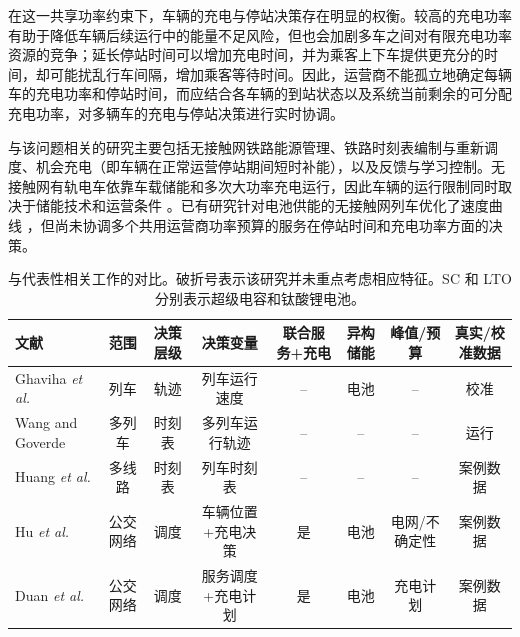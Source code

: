 \documentclass[conference]{IEEEtran}
\begin{document}
\begin{CJK*}{UTF8}{gbsn}
在这一共享功率约束下，车辆的充电与停站决策存在明显的权衡。较高的充电功率有助于降低车辆后续运行中的能量不足风险，但也会加剧多车之间对有限充电功率资源的竞争；延长停站时间可以增加充电时间，并为乘客上下车提供更充分的时间，却可能扰乱行车间隔，增加乘客等待时间。因此，运营商不能孤立地确定每辆车的充电功率和停站时间，而应结合各车辆的到站状态以及系统当前剩余的可分配充电功率，对多辆车的充电与停站决策进行实时协调。



与该问题相关的研究主要包括无接触网铁路能源管理、铁路时刻表编制与重新调度、机会充电（即车辆在正常运营停站期间短时补能），以及反馈与学习控制。无接触网有轨电车依靠车载储能和多次大功率充电运行，因此车辆的运行限制同时取决于储能技术和运营条件 \cite{guerrieri2019catenary}。已有研究针对电池供能的无接触网列车优化了速度曲线 \cite{ghaviha2019speed}，但尚未协调多个共用运营商功率预算的服务在停站时间和充电功率方面的决策。

\nocite{wang2019multitrain,liu2020robust,yang2020biobjective,huang2021integrated,huang2023twostage,liao2020realtime,he2020charging,hu2022joint,li2023cooperative,duan2023integrated,bi2024realtime,wu2022multidepot,li2023trajectory,schulman2017ppo,holland1975adaptation,kennedy1995pso,storn1997de}

\begin{table}[t]
\centering
\caption{与代表性相关工作的对比。破折号表示该研究并未重点考虑相应特征。SC 和 LTO 分别表示超级电容和钛酸锂电池。}
\label{tab:positioning}
\scriptsize
\setlength{\tabcolsep}{2.5pt}
\begin{tabular}{p{2.5cm}ccccccc}
\toprule
文献 & 范围 & 决策层级 & 决策变量 & 联合服务+充电 & 异构储能 & 峰值/预算 & 真实/校准数据 \\
\midrule
Ghaviha \textit{et al.} \cite{ghaviha2019speed}
& 列车
& 轨迹
& 列车运行速度
& --
& 电池
& --
& 校准 \\

Wang and Goverde \cite{wang2019multitrain}
& 多列车
& 时刻表
& 多列车运行轨迹
& --
& --
& --
& 运行 \\

Huang \textit{et al.} \cite{huang2021integrated}
& 多线路
& 时刻表
& 列车时刻表
& --
& --
& --
& 案例数据 \\

Hu \textit{et al.} \cite{hu2022joint}
& 公交网络
& 调度
& 车辆位置+充电决策
& 是
& 电池
& 电网/不确定性
& 案例数据 \\

Duan \textit{et al.} \cite{duan2023integrated}
& 公交网络
& 调度
& 服务调度+充电计划
& 是
& 电池
& 充电计划
& 案例数据 \\


\end{tabular}
\end{table}
\end{CJK*}
\end{document}
